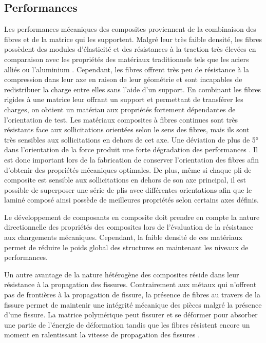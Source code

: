 \subsection{Performances}

Les performances mécaniques des composites proviennent de la combinaison des fibres et de la matrice qui les supportent. 
Malgré leur très faible densité, les fibres possèdent des modules d'élasticité et des résistances à la traction très élevées en comparaison avec les propriétés des matériaux traditionnels tels que les aciers alliés ou l'aluminium \cite{Hull2001}.
Cependant, les fibres offrent très peu de résistance à la compression dans leur axe en raison de leur géométrie et sont incapables de redistribuer la charge entre elles sans l'aide d'un support. 
En combinant les fibres rigides à une matrice leur offrant un support et permettant de transférer les charges, on obtient un matériau aux propriétés fortement dépendantes de l'orientation de test. 
Les matériaux composites à fibres continues sont très résistants face aux sollicitations orientées selon le sens des fibres, mais ils sont très sensibles aux sollicitations en dehors de cet axe. 
Une déviation de plus de 5° dans l'orientation de la force produit une forte dégradation des performances \cite{Hull2001}. 
Il est donc important lors de la fabrication de conserver l'orientation des fibres afin d'obtenir des propriétés mécaniques optimales. 
De plus, même si chaque pli de composite est sensible aux sollicitations en dehors de son axe principal, il est possible de superposer une série de plis avec différentes orientations afin que le laminé composé ainsi possède de meilleures propriétés selon certains axes définis. 

Le développement de composants en composite doit prendre en compte la nature directionnelle des propriétés des composites lors de l'évaluation de la résistance aux chargements mécaniques. 
Cependant, la faible densité de ces matériaux permet de réduire le poids global des structures en maintenant les niveaux de performances. 

Un autre avantage de la nature hétérogène des composites réside dans leur résistance à la propagation des fissures. 
Contrairement aux métaux qui n'offrent pas de frontières à la propagation de fissure, la présence de fibres au travers de la fissure permet de maintenir une intégrité mécanique des pièces malgré la présence d'une fissure. 
La matrice polymérique peut fissurer et se déformer pour absorber une partie de l'énergie de déformation tandis que les fibres résistent encore un moment en ralentissant la vitesse de propagation des fissures \cite{Hull2001}. 

